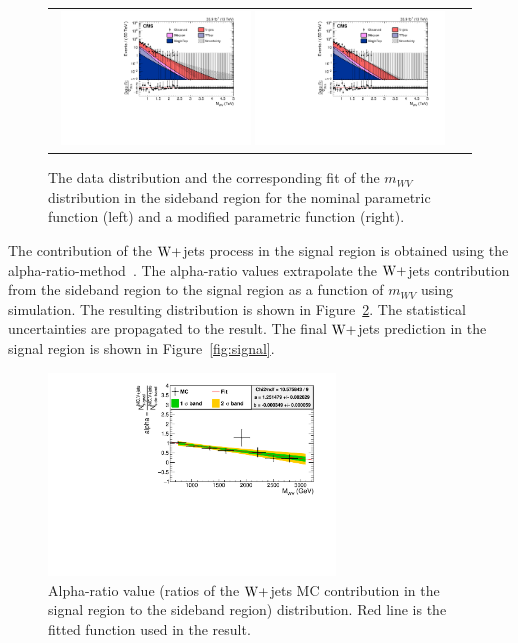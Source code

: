 \begin{figure}[!htbp] 
	 \centering 
	 \begin{tabular}{cc}
	 \includegraphics[width=0.48\textwidth]{Plots/BackgroundEstimation/WV/m_lvj_fitting/m_lvj_sb_lo_WJets0_xww__with_pull_log.pdf}
	 \includegraphics[width=0.48\textwidth]{Plots/BackgroundEstimation/WV/m_lvj_fitting/m_lvj_sb_lo_WJets01_xww__with_pull_log.pdf} 
	 \end{tabular}
	 \caption{The data distribution and the corresponding fit of the $m_{WV}$ distribution in the sideband region for the nominal parametric function (left) and a modified parametric function (right).}
	 \label{fig:DataMCForMWW}
\end{figure}

 The contribution of the $\mathrm{W}+$jets process in the signal region is obtained using the alpha-ratio-method~\cite{VV_resonance_2016,WVaTGC2016}. The alpha-ratio values extrapolate the $\mathrm{W}+$jets contribution from the sideband region to the signal region as a function of $m_{WV}$ using simulation. The resulting distribution is shown in Figure~\ref{fig:AlphaDis}. The statistical uncertainties are propagated to the result. The final $\mathrm{W}+$jets prediction in the signal region is shown in Figure~\ref{fig:signal}. 

\begin{figure}[!htbp] 
	 \centering 
	 \includegraphics[width=0.68\textwidth]{Plots/BackgroundEstimation/WV/WVchannel_AlphaDistribution_AfterFit_New2.pdf}
	 \caption{Alpha-ratio value (ratios of the $\mathrm{W}+$jets MC contribution in the signal region to the sideband region) distribution. Red line is the fitted function used in the result.}
	 \label{fig:AlphaDis}
\end{figure}

